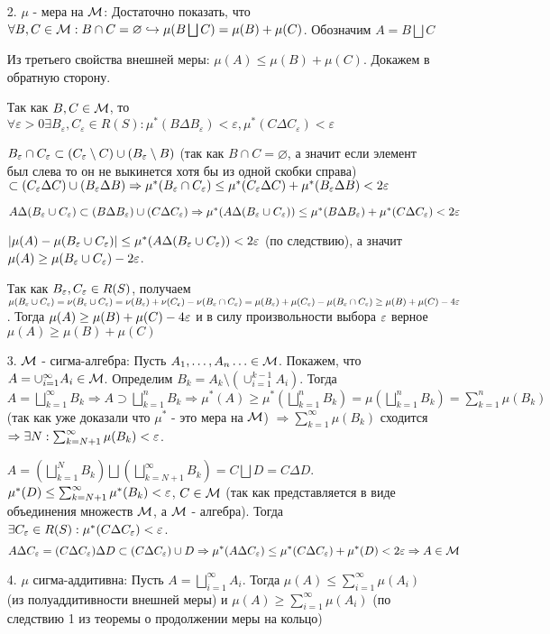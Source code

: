 \begin{itemize}
    \item[2.] $\mu$ - мера на $\mathcal{M}$: Достаточно показать, что $\forall B, C \in \mathcal{M}: B \cap C=\varnothing \hookrightarrow \mu(B \bigsqcup C)=\mu(B)+\mu(C)$. Обозначим $A=B \bigsqcup C$
    \par Из третьего свойства внешней меры: $\mu(A) \leq \mu(B)+\mu(C)$. Докажем в обратную сторону.
    \par Так как $B,C \in \mathcal{M}$, то $\forall \varepsilon>0 \exists B_\varepsilon, C_\varepsilon\in R(S): \mu^*(B \Delta B_\varepsilon) < \varepsilon, \mu^*(C \Delta C_\varepsilon)< \varepsilon$
    \par $B_\varepsilon \cap C_\varepsilon \subset (C_\varepsilon \setminus C) \cup (B_\varepsilon \setminus B)$ (так как $B \cap C = \varnothing$, а значит если элемент был слева то он не выкинется хотя бы из одной скобки справа) $\subset (C_\varepsilon \Delta C) \cup (B_\varepsilon \Delta B) \Rightarrow \mu^*(B_\varepsilon \cap C_\varepsilon) \leq \mu^*(C_\varepsilon \Delta C)+\mu^*(B_\varepsilon \Delta B) < 2\varepsilon$
    \par $A \Delta (B_\varepsilon \cup C_\varepsilon)\subset(B \Delta B_\varepsilon) \cup (C \Delta C_\varepsilon) \Rightarrow \mu^*(A \Delta (B_\varepsilon \cup C_\varepsilon)) \leq \mu^*(B \Delta B_\varepsilon)+\mu^*(C \Delta C_\varepsilon)<2\varepsilon$
    \par $|\mu(A)-\mu(B_\varepsilon \cup C_\varepsilon)| \leq \mu^*(A \Delta (B_\varepsilon \cup C_\varepsilon)) < 2\varepsilon$ (по следствию), а значит $\mu(A) \geq \mu(B_\varepsilon \cup C_\varepsilon)-2\varepsilon$.
    \par Так как $B_\varepsilon, C_\varepsilon \in R(S)$, получаем $\mu(B_\varepsilon \cup C_\varepsilon)=\nu(B_\varepsilon \cup C_\varepsilon)=\nu(B_\varepsilon)+\nu(C_\varepsilon)-\nu(B_\varepsilon \cap C_\varepsilon)=\mu(B_\varepsilon)+\mu(C_\varepsilon)-\mu(B_\varepsilon \cap C_\varepsilon) \geq \mu(B)+\mu(C)-4\varepsilon$. Тогда $\mu(A) \geq \mu(B)+\mu(C)-4\varepsilon$ и в силу произвольности выбора $\varepsilon$ верное $\mu(A)\geq \mu(B)+\mu(C)$ \EndProof
    \item[3.] $\mathcal{M}$ - сигма-алгебра: Пусть $A_1, \ldots, A_n \ldots \in \mathcal{M}$. Покажем, что $A=\cup_{i=1}^\infty A_i \in \mathcal{M}$. Определим $B_k=A_k \setminus (\cup_{i=1}^{k-1} A_i)$. Тогда $A=\bigsqcup_{k=1}^\infty B_k \Rightarrow A \supset \bigsqcup_{k=1}^n B_k \Rightarrow \mu^*(A) \geq \mu^*(\bigsqcup_{k=1}^n B_k)=\mu(\bigsqcup_{k=1}^n B_k)=\sum_{k=1}^n \mu(B_k)$ (так как уже доказали что $\mu^*$ - это мера на $\mathcal{M}$) $\Rightarrow \sum_{k=1}^\infty \mu(B_k)$ сходится $\Rightarrow \exists N: \sum_{k=N+1}^\infty \mu(B_k) < \varepsilon$.
    \par $A=(\bigsqcup_{k=1}^N B_k)\bigsqcup(\bigsqcup_{k=N+1}^\infty B_k)=C \bigsqcup D=C \Delta D$. $\mu^*(D) \leq \sum_{k=N+1}^\infty \mu^*(B_k) < \varepsilon$, $C \in \mathcal{M}$ (так как представляется в виде объединения множеств $\mathcal{M}$, а $\mathcal{M}$ - алгебра). Тогда $\exists C_\varepsilon \in R(S): \mu^*(C \Delta C_\varepsilon)<\varepsilon$. 
    $$A \Delta C_\varepsilon=(C \Delta C_\varepsilon) \Delta D \subset (C \Delta C_\varepsilon) \cup D \Rightarrow \mu^*(A \Delta C_\varepsilon) \leq \mu^*(C \Delta C_\varepsilon)+\mu^*(D)<2\varepsilon \Rightarrow A\in \mathcal{M}$$
    \item[4.] $\mu$ сигма-аддитивна: Пусть $A=\bigsqcup_{i=1}^\infty A_i$. Тогда $\mu(A) \leq \sum_{i=1}^\infty \mu(A_i)$ (из полуаддитивности внешней меры) и $\mu(A) \geq \sum_{i=1}^\infty \mu(A_i)$ (по следствию 1 из теоремы о продолжении меры на кольцо) \EndProof
\end{itemize}

